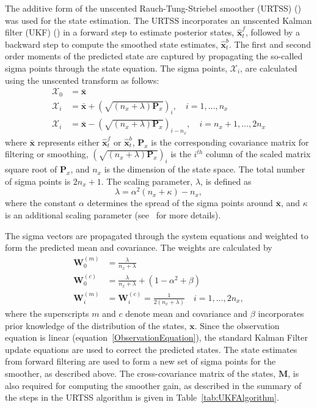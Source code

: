 \documentclass[5p,authoryear]{elsarticle}
\begin{document}
The additive form of the unscented Rauch-Tung-Striebel smoother (URTSS) (\cite{Sarkka2010}) was used for the state estimation. The URTSS incorporates an unscented Kalman filter (UKF) (\cite{Julier1997, Merwe2003}) in a forward step to estimate posterior states, $\hat{\mathbf x}_t^{f}$, followed by a backward step to compute the smoothed state estimates, $\hat{\mathbf x}_t^{b}$. The first and second order moments of the predicted state are captured by propagating the so-called sigma points through the state equation. The sigma points, $\mathcal X_i$, are calculated using the unscented transform as follows:
\begin{align}\label{eq:sigmapoints1}
	\mathcal X_{0}&=\mathbf{\bar x} \\
	\mathcal X_{i}&= \mathbf{\bar x}+\left(\sqrt{( n_x + \lambda)\mathbf P_x}\right)_i, \quad i=1, \dots, n_x \\
	\mathcal X_{i}&=\mathbf{\bar x}-\left(\sqrt{( n_x + \lambda)\mathbf P_x}\right)_{i- n_x}, \quad i= n_x+1, \dots, 2n_x 
\end{align}
where $\mathbf{\bar x}$ represents either $\hat{\mathbf x}_t^{f}$ or $\hat{\mathbf x}_t^{b}$, $\mathbf{P}_x$ is the corresponding covariance matrix for filtering or smoothing, $\left(\sqrt{( n_x + \lambda)\mathbf P_x}\right)_i$ is the $i^{th}$ column of the scaled matrix square root of $\mathbf P_x$, and $n_x$ is the dimension of the state space. The total number of sigma points is $2n_x+1$. The scaling parameter, $\lambda$, is defined as 
\begin{equation}\label{eq:sigmapoints3}
	\lambda=\alpha^2( n_x+\kappa) - n_x, 
\end{equation}
where the constant $\alpha$ determines the spread of the sigma points around $\mathbf{\bar x}$, and $\kappa$ is an additional scaling parameter (see~\cite{Haykin2001} for more details). 

The sigma vectors are propagated through the system equations and weighted to form the predicted mean and covariance. The weights are calculated by 
\begin{align}
	\mathbf W_0^{(m)}&=\frac{\lambda}{ n_x+\lambda} \\
	\mathbf W_0^{(c)}&=\frac{\lambda}{ n_x+\lambda}+(1-\alpha^2+\beta) \\
	\mathbf W_i^{(m)}&=\mathbf W_i^{(c)}=\frac{1}{2( n_x+\lambda)} \quad i=1, \dots, 2n_x, 
\end{align}
where the superscripts $m$ and $c$ denote mean and covariance and $\beta$ incorporates prior knowledge of the distribution of the states, $\mathbf{x}$. Since the observation equation is linear (equation~\ref{ObservationEquation}), the standard Kalman Filter update equations are used to correct the predicted states. The state estimates from forward filtering are used to form a new set of sigma points for the smoother, as described above. The cross-covariance matrix of the states, $\mathbf M$, is also required for computing the smoother gain, as described in the summary of the steps in the URTSS algorithm is given in Table~\ref{tab:UKFAlgorithm}.
\end{document}
